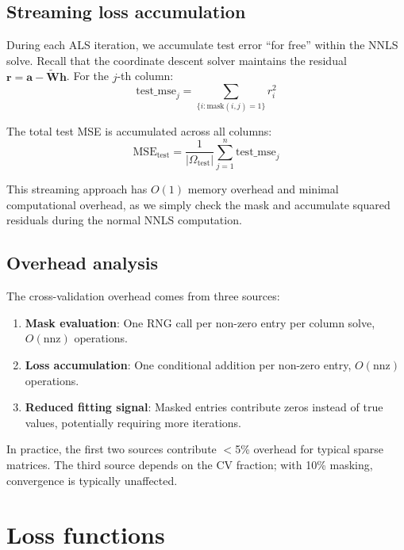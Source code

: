 \documentclass[11pt]{article}
\begin{document}
\subsection{Streaming loss accumulation}

During each ALS iteration, we accumulate test error ``for free'' within the 
NNLS solve. Recall that the coordinate descent solver maintains the residual 
$\mathbf{r} = \mathbf{a} - \tilde{\mathbf{W}}\mathbf{h}$. For the $j$-th column:
\begin{equation}
  \text{test\_mse}_j = \sum_{\{i : \text{mask}(i,j)=1\}} r_i^2
  \label{eq:streaming}
\end{equation}

The total test MSE is accumulated across all columns:
\begin{equation}
  \text{MSE}_{\text{test}} = \frac{1}{|\Omega_{\text{test}}|} 
  \sum_{j=1}^{n} \text{test\_mse}_j
  \label{eq:total_test}
\end{equation}

This streaming approach has $O(1)$ memory overhead and minimal computational 
overhead, as we simply check the mask and accumulate squared residuals during 
the normal NNLS computation.

\subsection{Overhead analysis}

The cross-validation overhead comes from three sources:
\begin{enumerate}
  \item \textbf{Mask evaluation}: One RNG call per non-zero entry per column 
  solve, $O(\text{nnz})$ operations.
  \item \textbf{Loss accumulation}: One conditional addition per non-zero entry, 
  $O(\text{nnz})$ operations.
  \item \textbf{Reduced fitting signal}: Masked entries contribute zeros instead 
  of true values, potentially requiring more iterations.
\end{enumerate}

In practice, the first two sources contribute $<$5\% overhead for typical sparse 
matrices. The third source depends on the CV fraction; with 10\% masking, 
convergence is typically unaffected.


\section{Loss functions} \label{sec:lossfunctions}
\end{document}
